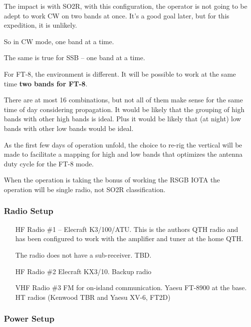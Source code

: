 \documentclass[11pt]{article}
\begin{document}
The impact is with SO2R, with this configuration, the operator is not
going to be adept to work CW on two bands at once.  It's a good goal
later, but for this expedition, it is unlikely. \par
So in CW mode, one band at a time.
\par

The same is true for SSB -- one band at a time.
\par

For FT-8, the environment is different.  It will be possible to work
at the same time {\textbf{two bands for FT-8}}. 
\par

There are at most 16 combinations, but not all of them make sense for
the same time of day considering propagation.  It would be likely that
the grouping of high bands with other high bands is ideal.  Plus it would
be likely that (at night) low bands with other low bands would be ideal.
\par

As the first few days of operation unfold, the choice to re-rig the
vertical will be made to facilitate a mapping for high and low bands
that optimizes the antenna duty cycle for the FT-8 mode.
\par

When the operation is taking the bonus of working the RSGB IOTA
the operation will be single radio, not SO2R classification.

\subsubsection{Radio Setup}

\begin{itemize}
\item[HF Radio \#1] -- Elecraft K3/100/ATU.  This is the authors QTH radio and has been configured to work with the amplifier and tuner at the home QTH.
\par
The radio does not have a sub-receiver. TBD.
\item[HF Radio \#2] Elecraft KX3/10.  Backup radio
\item[VHF Radio \#3] FM for on-island communication.  Yaesu FT-8900 at the base.
HT radios (Kenwood TBR and Yaesu XV-6, FT2D)
\end{itemize}

\subsubsection{Power Setup}
\end{document}
